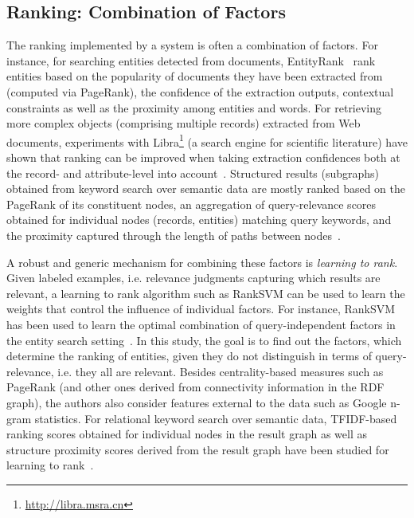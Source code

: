 \subsection{Ranking: Combination of Factors}
The ranking implemented by a system is often a combination of factors. For instance, for searching entities detected from documents, EntityRank~\cite{DBLP:conf/vldb/ChengYC07} rank entities based on the popularity of documents they have been extracted from (computed via PageRank), the confidence of the extraction outputs, contextual constraints as well as the proximity among entities and words. For retrieving more complex objects (comprising multiple records) extracted from Web documents, experiments with Libra\footnote{\url{http://libra.msra.cn}} (a search engine for scientific literature) have shown that ranking can be improved when taking extraction confidences both at the record- and attribute-level into account~\cite{DBLP:conf/www/NieMSWM07}. Structured results (subgraphs) obtained from keyword search over semantic data are mostly ranked based on the PageRank of its constituent nodes, an aggregation of query-relevance scores obtained for individual nodes (records, entities) matching query keywords, and the proximity captured through the length of paths between nodes~\cite{DBLP:conf/icde/TranWRC09}. 

A robust and generic mechanism for combining these factors is \emph{learning to rank}. Given labeled examples, i.e. relevance judgments capturing which results are relevant, a learning to rank algorithm such as RankSVM can be used to learn the weights that control the influence of individual factors. For instance, RankSVM has been used to learn the optimal combination of query-independent factors in the entity search setting~\cite{DBLP:conf/eswc/Tran12}. In this study, the goal is to find out the factors, which determine the ranking of entities, given they do not distinguish in terms of query-relevance, i.e. they all are relevant. Besides centrality-based measures such as PageRank (and other ones derived from connectivity information in the RDF graph), the authors also consider features external to the data such as Google n-gram statistics. For relational keyword search over semantic data, TFIDF-based ranking scores obtained for individual nodes in the result graph as well as structure proximity scores derived from the result graph have been studied for learning to rank~\cite{DBLP:conf/cikm/CoffmanW11}. 


